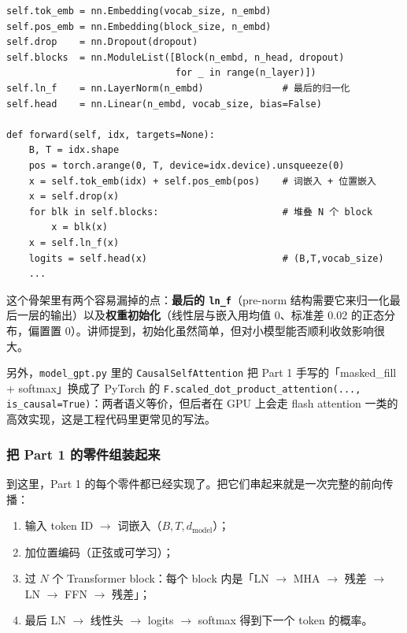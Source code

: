\begin{lstlisting}[caption={GPT 主干的骨架（据 \texttt{part\_2/model\_gpt.py} 精简）}]
self.tok_emb = nn.Embedding(vocab_size, n_embd)
self.pos_emb = nn.Embedding(block_size, n_embd)
self.drop    = nn.Dropout(dropout)
self.blocks  = nn.ModuleList([Block(n_embd, n_head, dropout)
                              for _ in range(n_layer)])
self.ln_f    = nn.LayerNorm(n_embd)              # 最后的归一化
self.head    = nn.Linear(n_embd, vocab_size, bias=False)

def forward(self, idx, targets=None):
    B, T = idx.shape
    pos = torch.arange(0, T, device=idx.device).unsqueeze(0)
    x = self.tok_emb(idx) + self.pos_emb(pos)    # 词嵌入 + 位置嵌入
    x = self.drop(x)
    for blk in self.blocks:                      # 堆叠 N 个 block
        x = blk(x)
    x = self.ln_f(x)
    logits = self.head(x)                        # (B,T,vocab_size)
    ...
\end{lstlisting}

这个骨架里有两个容易漏掉的点：\textbf{最后的 \texttt{ln\_f}}（pre-norm 结构需要它来归一化最后一层的输出）以及\textbf{权重初始化}（线性层与嵌入用均值 0、标准差 0.02 的正态分布，偏置置 0）。讲师提到，初始化虽然简单，但对小模型能否顺利收敛影响很大。

另外，\texttt{model\_gpt.py} 里的 \texttt{CausalSelfAttention} 把 Part 1 手写的「masked\_fill + softmax」换成了 PyTorch 的 \texttt{F.scaled\_dot\_product\_attention(..., is\_causal=True)}：两者语义等价，但后者在 GPU 上会走 flash attention 一类的高效实现，这是工程代码里更常见的写法。

\subsubsection{把 Part 1 的零件组装起来}

到这里，Part 1 的每个零件都已经实现了。把它们串起来就是一次完整的前向传播：

\begin{enumerate}
\item 输入 token ID $\rightarrow$ 词嵌入（$B,T,d_{\text{model}}$）；
\item 加位置编码（正弦或可学习）；
\item 过 $N$ 个 Transformer block：每个 block 内是「LN $\rightarrow$ MHA $\rightarrow$ 残差 $\rightarrow$ LN $\rightarrow$ FFN $\rightarrow$ 残差」；
\item 最后 LN $\rightarrow$ 线性头 $\rightarrow$ logits $\rightarrow$ softmax 得到下一个 token 的概率。
\end{enumerate}


